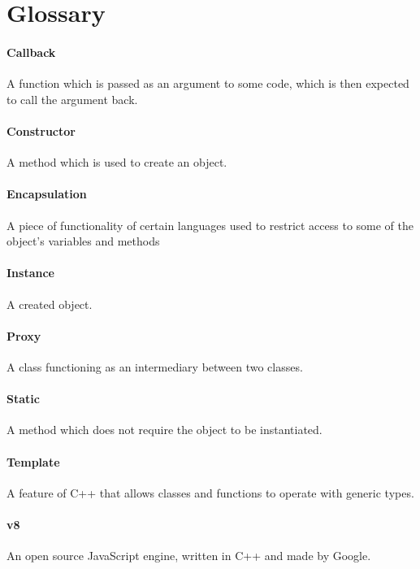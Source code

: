 \section{Glossary}
\paragraph{Callback}
A function which is passed as an argument to some code, which is then expected to call the argument back.
\paragraph{Constructor}
A method which is used to create an object.
\paragraph{Encapsulation}
A piece of functionality of certain languages used to restrict access to some of the object's variables and methods
\paragraph{Instance}
A created object.
\paragraph{Proxy}
A class functioning as an intermediary between two classes.
\paragraph{Static}
A method which does not require the object to be instantiated.
\paragraph{Template} 
A feature of C++ that allows classes and functions to operate with generic types.
\paragraph{v8} 
An open source JavaScript engine, written in C++ and made by Google.
